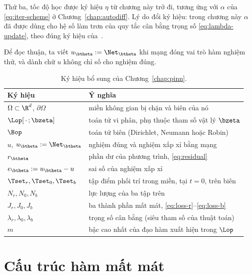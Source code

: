 Thứ ba, tốc độ học được ký hiệu $\eta$ từ chương này trở đi, tương ứng với
$\alpha$ của \eqref{eq:iter-scheme} ở Chương~\ref{chap:autodiff}. Lý do đổi ký
hiệu: trong chương này $\alpha$ đã được dùng cho hệ số làm trơn của quy tắc cân
bằng trọng số \eqref{eq:lambda-update}, theo đúng ký hiệu của~\cite{wang2021}.

Để đọc thuận, ta viết $u_{\btheta} := \Net_{\btheta}$ khi mạng đóng vai trò hàm
nghiệm thử, và dành chữ $u$ không chỉ số cho nghiệm đúng.
 
\begin{table}[htbp]
\centering
\caption{Ký hiệu bổ sung của Chương~\ref{chap:pinn}.}
\label{tab:ky-hieu-4}
\small
\begin{tabular}{@{}l p{9.2cm}@{}}
\toprule
\textbf{Ký hiệu} & \textbf{Ý nghĩa} \\
\midrule
$\Omega \subset \R^{d}$, $\partial\Omega$ & miền không gian bị chặn và biên của
  nó \\
$\Lop[\,\cdot\,;\bzeta]$ & toán tử vi phân, phụ thuộc tham số vật lý $\bzeta$ \\
$\Bop$ & toán tử biên (Dirichlet, Neumann hoặc Robin) \\
$u$, $u_{\btheta} := \Net_{\btheta}$ & nghiệm đúng và nghiệm xấp xỉ bằng mạng \\
$r_{\btheta}$ & phần dư của phương trình, \eqref{eq:residual} \\
$e_{\btheta} := u_{\btheta} - u$ & sai số của nghiệm xấp xỉ \\
$\Tset_r, \Tset_0, \Tset_b$ & tập điểm phối trí trong miền, tại $t=0$, trên biên \\
$N_r, N_0, N_b$ & lực lượng của ba tập trên \\
$J_r, J_0, J_b$ & ba thành phần mất mát, \eqref{eq:loss-r}--\eqref{eq:loss-b} \\
$\lambda_r,\lambda_0,\lambda_b$ & trọng số cân bằng (siêu tham số của thuật
  toán) \\
$m$ & bậc cao nhất của đạo hàm xuất hiện trong $\Lop$ \\
\bottomrule
\end{tabular}
\end{table}
 
\section{Cấu trúc hàm mất mát}
\label{sec:cau-truc-loss}
 
